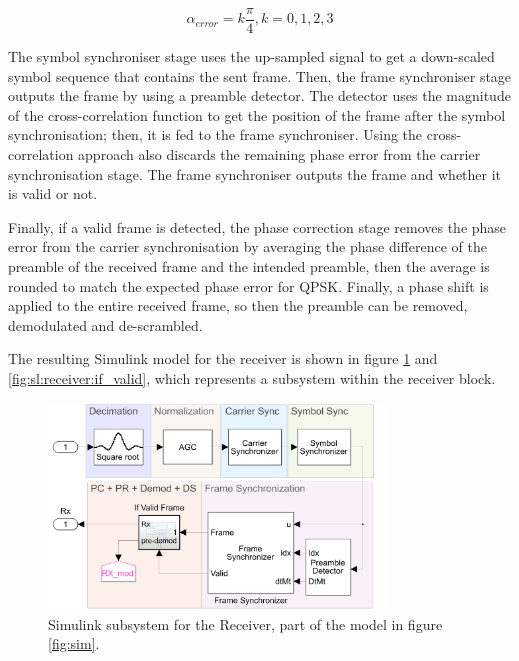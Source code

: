 \documentclass[12pt,a4paper]{report}
\begin{document}
\begin{equation}
   \alpha_{error} = k \frac{\pi}{4}, k = 0, 1, 2, 3
   \label{eq:qpsk_phase_error}
\end{equation}

The symbol synchroniser stage uses the up-sampled signal to get a down-scaled symbol sequence that contains the sent frame. Then, the frame synchroniser stage outputs the frame by using a preamble detector. The detector uses the magnitude of the cross-correlation function to get the position of the frame after the symbol synchronisation;  then, it is fed to the frame synchroniser. Using the cross-correlation approach also discards the remaining phase error from the carrier synchronisation stage. The frame synchroniser outputs the frame and whether it is valid or not. \cite{Mathworks2020SymbolSynchronization}

Finally, if a valid frame is detected, the phase correction stage removes the phase error from the carrier synchronisation by averaging the phase difference of the preamble of the received frame and the intended preamble, then the average is rounded to match the expected phase error for QPSK. Finally, a phase shift is applied to the entire received frame, so then the preamble can be removed, demodulated and de-scrambled. \cite{Mathworks2020SymbolSynchronization}

The resulting Simulink model for the receiver is shown in figure \ref{fig:sl:receiver} and \ref{fig:sl:receiver:if_valid}, which represents a subsystem within the receiver block.

\begin{figure}[!]
    \centering
    \includegraphics[width = 0.8\textwidth]{Figures/SL_receiver.png}
    \caption[Simulink subsystem for the Receiver.]{Simulink subsystem for the Receiver, part of the model in figure \ref{fig:sim}.}
    \label{fig:sl:receiver}
\end{figure}
\end{document}

